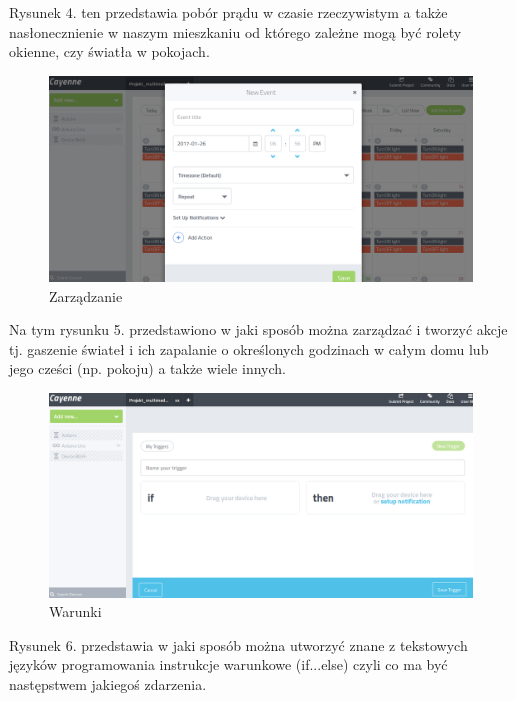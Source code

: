 \documentclass[12pt]{article} %
\begin{document}
Rysunek 4. ten przedstawia pobór prądu w czasie rzeczywistym a także nasłonecznienie w naszym mieszkaniu od którego zależne mogą być rolety okienne, czy światła w pokojach.

\begin{figure}[!h]
  \centering
  \includegraphics[width=\columnwidth]{images/4.png}
  \caption{Zarządzanie}
  \end{figure}

Na tym rysunku 5. przedstawiono w jaki sposób można zarządzać i tworzyć akcje tj. gaszenie świateł i ich zapalanie o określonych godzinach w całym domu lub jego cześci (np. pokoju) a także wiele innych.

\begin{figure}[!h]
  \centering
  \includegraphics[width=\columnwidth]{images/5.png}
  \caption{Warunki}
\end{figure}
Rysunek 6. przedstawia w jaki sposób można utworzyć znane z tekstowych języków programowania instrukcje warunkowe (if...else) czyli co ma być następstwem jakiegoś zdarzenia.
\end{document}
